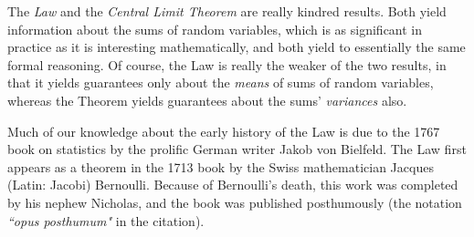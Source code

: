 \medskip

The {\it Law} and the {\it Central Limit Theorem} are really kindred results.  Both yield information about the sums of random variables, which is as significant in practice as it is interesting mathematically, and both yield to essentially the same formal reasoning.  Of course, the Law is really the weaker of the two results, in that it yields guarantees only about the {\em means} of sums of random variables, whereas the Theorem yields guarantees about the sums' {\em variances} also.

\bigskip

\noindent {}

\bigskip

  

Much of our knowledge about the early history of the Law is due to the 1767 book on statistics by the prolific German writer Jakob von Bielfeld.  The Law first appears as a theorem in the 1713 book \cite{Bernoulli} by the Swiss mathematician Jacques (Latin: Jacobi) Bernoulli.  Because of Bernoulli's death, this work was completed by his nephew Nicholas, and the book was published posthumously (the notation {\it ``opus posthumum"} in the citation). 

